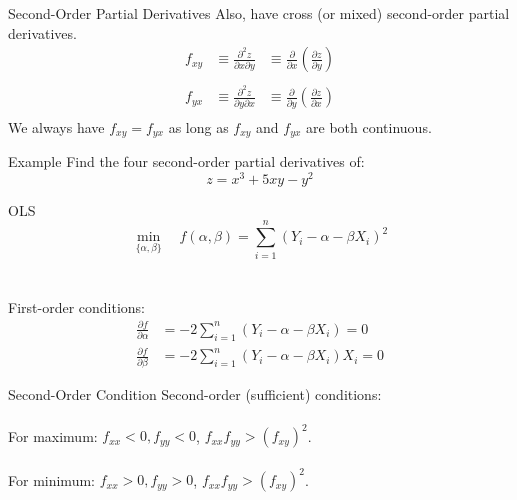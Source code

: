 \documentclass{./../../Latex/teaching_slides}
\begin{document}
\begin{frame}{Second-Order Partial Derivatives}
Also, have cross (or mixed) second-order partial derivatives.
$$
\begin{aligned}
f_{x y} & \equiv \frac{\partial^{2} z} {\partial x \partial y} &\equiv \frac{\partial}{\partial x}\left(\frac{\partial z}{\partial y}\right) \\~\\
f_{y x} & \equiv \frac{\partial^{2} z}{\partial y \partial x}  & \equiv \frac{\partial}{\partial y}\left(\frac{\partial z}{\partial x}\right) \\
\end{aligned}
$$
We always have  $f_{x y}=f_{yx}$ as long as $f_{x y}$ and $f_{y x}$ are both continuous. 
\end{frame}

\begin{frame}{Example}
Find the four second-order partial derivatives of:
$$ z = x^3 + 5xy-y^2 $$
\end{frame}

\begin{frame}{OLS}
\vspace{-1.5em}
$$ \min_{\{\alpha,\beta\}} \quad f(\alpha,\beta) = \sum_{i=1}^n (Y_i- \alpha - \beta X_i)^2  $$ \\~\\
First-order conditions:
\begin{align*}
	\frac{\partial f}{\partial \alpha} &= -2 \sum_{i=1}^n (Y_i- \alpha - \beta X_i) = 0 \\
	\frac{\partial f}{\partial \beta} &= -2 \sum_{i=1}^n (Y_i- \alpha - \beta X_i)X_i = 0
\end{align*}
\end{frame}


\begin{frame}{Second-Order Condition}
Second-order (sufficient) conditions:\\~\\
For maximum:
 $f_{x x}<0, f_{y y}<0$, $f_{x x} f_{y y}>\left(f_{x y}\right)^{2}$. \\~\\
For minimum:
 $f_{x x}>0, f_{y y}>0$, $f_{x x} f_{y y}>\left(f_{x y}\right)^{2}$.
\end{frame}
\end{document}

